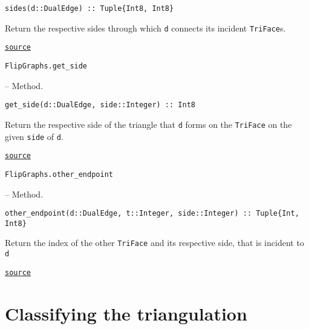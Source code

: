 \begin{adjustwidth}{2em}{0pt}


\begin{verbatim}
sides(d::DualEdge) :: Tuple{Int8, Int8}
\end{verbatim}

Return the respective sides through which \texttt{d} connects its incident \texttt{TriFace}s.



\href{https://github.com/schto223/FlipGraphs.jl/blob/e35d43698a06b86273148826b79d585ba04fcd26/src/deltaComplex.jl#L111-L115}{\texttt{source}}


\end{adjustwidth}
\hypertarget{4112526725817145726}{\texttt{FlipGraphs.get\_side}}  -- {Method.}

\begin{adjustwidth}{2em}{0pt}


\begin{verbatim}
get_side(d::DualEdge, side::Integer) :: Int8
\end{verbatim}

Return the respective side of the triangle that \texttt{d} forms on the \texttt{TriFace} on the given \texttt{side} of \texttt{d}.



\href{https://github.com/schto223/FlipGraphs.jl/blob/e35d43698a06b86273148826b79d585ba04fcd26/src/deltaComplex.jl#L118-L122}{\texttt{source}}


\end{adjustwidth}
\hypertarget{15748626811343085304}{\texttt{FlipGraphs.other\_endpoint}}  -- {Method.}

\begin{adjustwidth}{2em}{0pt}


\begin{verbatim}
other_endpoint(d::DualEdge, t::Integer, side::Integer) :: Tuple{Int, Int8}
\end{verbatim}

Return the index of the other \texttt{TriFace} and its respective side, that is incident to \texttt{d} 



\href{https://github.com/schto223/FlipGraphs.jl/blob/e35d43698a06b86273148826b79d585ba04fcd26/src/deltaComplex.jl#L167-L171}{\texttt{source}}


\end{adjustwidth}

\section{Classifying the triangulation}



